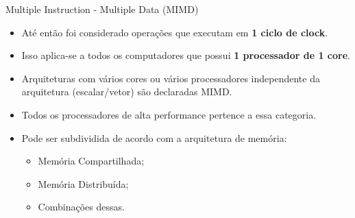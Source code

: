 \begin{frame}{Multiple Instruction - Multiple Data (MIMD)}
	\begin{itemize}
		\item Até então foi considerado operações que executam em \textbf{1 ciclo de clock}.
		\item Isso aplica-se a todos os computadores que possui \textbf{1 processador de 1 core}.
		\item Arquiteturas com vários cores ou vários processadores independente da arquitetura (escalar/vetor) são declaradas MIMD.
		\item Todos os processadores de alta performance pertence a essa categoria.
		\item Pode ser subdividida de acordo com a arquitetura de memória:
		\begin{itemize}
			\item Memória Compartilhada;
			\item Memória Distribuída;
			\item Combinações dessas.
		\end{itemize}

	\end{itemize}

\end{frame}









